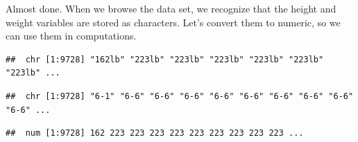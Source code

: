 \documentclass[
]{book}
\newenvironment{Shaded}{\begin{snugshade}}{\end{snugshade}}
\newcommand{\AttributeTok}[1]{\textcolor[rgb]{0.13,0.29,0.53}{#1}}
\newcommand{\FunctionTok}[1]{\textcolor[rgb]{0.13,0.29,0.53}{\textbf{#1}}}
\newcommand{\NormalTok}[1]{#1}
\newcommand{\OtherTok}[1]{\textcolor[rgb]{0.56,0.35,0.01}{#1}}
\newcommand{\SpecialCharTok}[1]{\textcolor[rgb]{0.81,0.36,0.00}{\textbf{#1}}}
\newcommand{\StringTok}[1]{\textcolor[rgb]{0.31,0.60,0.02}{#1}}
\begin{document}
Almost done. When we browse the data set, we recognize that the height and weight variables are stored as characters. Let's convert them to numeric, so we can use them in computations.

\begin{Shaded}
\end{Shaded}

\begin{verbatim}
##  chr [1:9728] "162lb" "223lb" "223lb" "223lb" "223lb" "223lb" "223lb" ...
\end{verbatim}

\begin{Shaded}
\end{Shaded}

\begin{verbatim}
##  chr [1:9728] "6-1" "6-6" "6-6" "6-6" "6-6" "6-6" "6-6" "6-6" "6-6" "6-6" ...
\end{verbatim}

\begin{Shaded}
\end{Shaded}

\begin{verbatim}
##  num [1:9728] 162 223 223 223 223 223 223 223 223 223 ...
\end{verbatim}

\begin{Shaded}
\end{Shaded}
\end{document}
